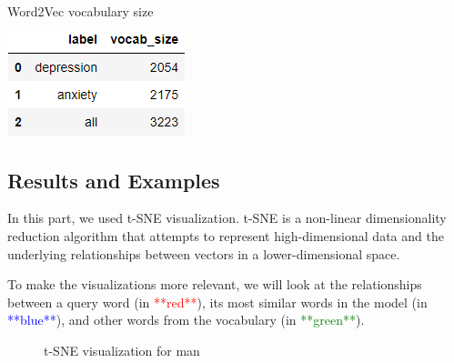 \documentclass[12pt, a4paper]{article}
\begin{document}
\begin{table}[H]
	\caption{Word2Vec vocabulary size} 
	\centering 
	\vspace{5mm} 
	\includegraphics[width=0.5\linewidth]{../reports/images/w2v_vocab-size.png}
	\label{w2v_vocab-size} 
\end{table}


\subsection{Results and Examples}
In this part, we used t-SNE visualization. t-SNE is a non-linear dimensionality reduction algorithm that attempts to represent high-dimensional data and the underlying relationships between vectors in a lower-dimensional space.

To make the visualizations more relevant, we will look at the relationships between a query word (in \textcolor{red}{**red**}), its most similar words in the model (in \textcolor{blue}{**blue**}), and other words from the vocabulary (in \textcolor{green}{**green**}).
\begin{figure}[H]
	\caption{t-SNE visualization for man}
	\label{word2vec_depression_man}
\end{figure}
\end{document}

